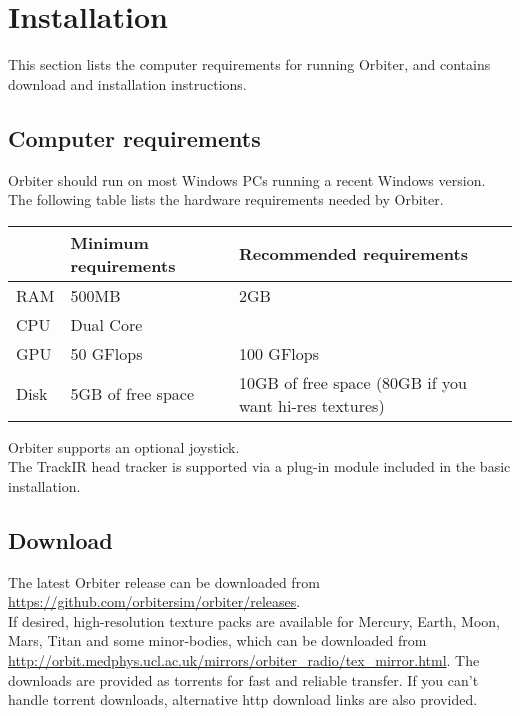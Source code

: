 \documentclass[Orbiter User Manual.tex]{subfiles}
\begin{document}
\section{Installation}
\label{sec:installation}
This section lists the computer requirements for running Orbiter, and contains download and installation instructions.

\subsection{Computer requirements}
Orbiter should run on most Windows PCs running a recent Windows version.\\
The following table lists the hardware requirements needed by Orbiter.

	\begin{longtable}{ |p{}|p{}|p{}| }
	\hline\rule{0pt}{2ex}
	& \textbf{Minimum requirements} & \textbf{Recommended requirements}\\
	\hline\rule{0pt}{2ex}
	RAM & 500MB & 2GB\\
	\hline\rule{0pt}{2ex}
	CPU & Dual Core &\\
	\hline\rule{0pt}{2ex}
	GPU & 50 GFlops & 100 GFlops\\
	\hline\rule{0pt}{2ex}
	Disk & 5GB of free space & 10GB of free space (80GB if you want hi-res textures)\\
	\hline
	\end{longtable}

\noindent
Orbiter supports an optional joystick.\\
The TrackIR head tracker is supported via a plug-in module included in the basic installation.

\subsection{Download}
The latest Orbiter release can be downloaded from \url{https://github.com/orbitersim/orbiter/releases}.\\
If desired, high-resolution texture packs are available for Mercury, Earth, Moon, Mars, Titan and some minor-bodies, which can be downloaded from \url{http://orbit.medphys.ucl.ac.uk/mirrors/orbiter_radio/tex_mirror.html}. The downloads are provided as torrents for fast and reliable transfer. If you can't handle torrent downloads, alternative http download links are also provided.
\end{document}
